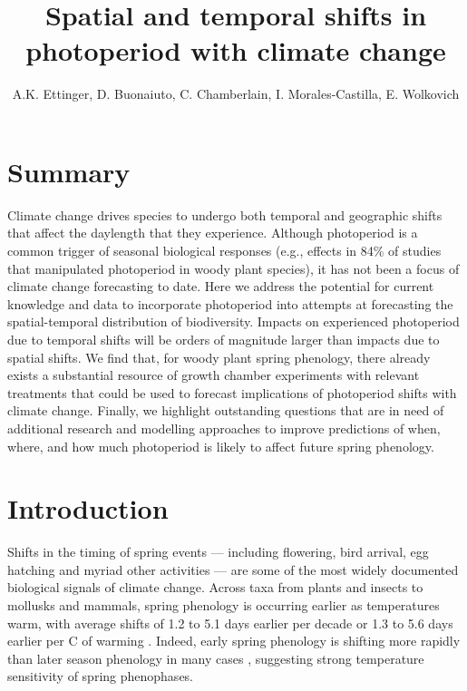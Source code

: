 \documentclass{article}
\begin{document}
 
\title{Spatial and temporal shifts in photoperiod with climate change} %

\author{A.K. Ettinger, D. Buonaiuto, C. Chamberlain, I. Morales-Castilla, E. Wolkovich}
\maketitle  %


\section*{Summary}
Climate change drives species to undergo both temporal and geographic shifts that affect the daylength that they experience. Although photoperiod is a common trigger of seasonal biological responses (e.g., effects in 84\% of studies that manipulated photoperiod in woody plant species), it has not been a focus of climate change forecasting to date. Here we address the potential for current knowledge and data to incorporate photoperiod into attempts at forecasting the spatial-temporal distribution of biodiversity. Impacts on experienced photoperiod due to temporal shifts will be  orders of magnitude larger than impacts due to spatial shifts. We find that, for woody plant spring phenology, there already exists a substantial resource of growth chamber experiments with relevant treatments that could be used to forecast implications of photoperiod shifts with climate change. Finally, we highlight outstanding questions that are in need of additional research and modelling approaches to improve predictions of when, where, and how much photoperiod is likely to affect future spring phenology.


\section*{Introduction}
\par Shifts in the timing of spring events --- including flowering, bird arrival, egg hatching and myriad other activities --- are some of the most widely documented biological signals of climate change. Across taxa from plants and insects to mollusks and mammals, spring phenology is occurring earlier as temperatures warm, with average shifts of 1.2 to 5.1 days earlier per decade \citep{bradley1999,parmesan2003, root2003} or 1.3 to 5.6 days earlier per \degree C of warming \citep{wolkovich2012,polgar2013}. Indeed, early spring phenology is shifting more rapidly than later season phenology in many cases \citep{bradley1999,menzel2006}, suggesting strong temperature sensitivity of spring phenophases.
\end{document}

